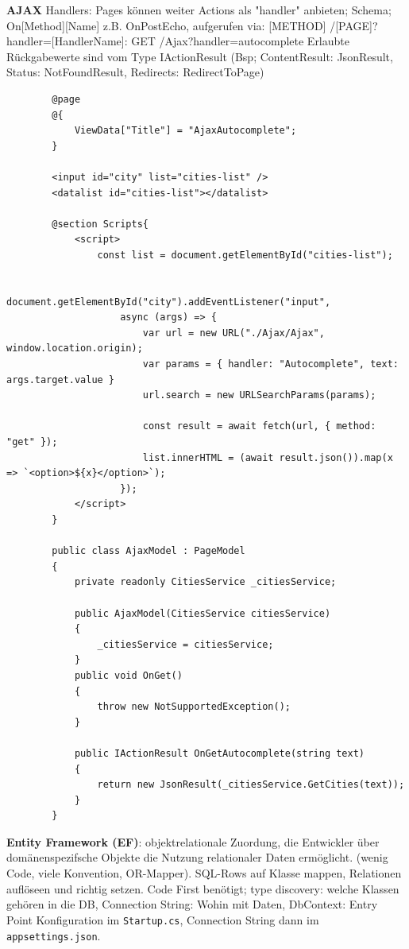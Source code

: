 \documentclass[10pt,landscape]{article}
\begin{document}
\begin{multicols}{2}
        \textbf{AJAX}
        Handlers: Pages können weiter Actions als "handler" anbieten; Schema; On[Method][Name] z.B. OnPostEcho, aufgerufen via: [METHOD] /[PAGE]?handler=[HandlerName]: GET /Ajax?handler=autocomplete
        Erlaubte Rückgabewerte sind vom Type IActionResult (Bsp; ContentResult: JsonResult, Status: NotFoundResult, Redirects: RedirectToPage)

        \begin{lstlisting}
        @page
        @{
            ViewData["Title"] = "AjaxAutocomplete";
        }

        <input id="city" list="cities-list" />
        <datalist id="cities-list"></datalist>

        @section Scripts{
            <script>
                const list = document.getElementById("cities-list");

                document.getElementById("city").addEventListener("input",
                    async (args) => {
                        var url = new URL("./Ajax/Ajax", window.location.origin);
                        var params = { handler: "Autocomplete", text: args.target.value }
                        url.search = new URLSearchParams(params);

                        const result = await fetch(url, { method: "get" });
                        list.innerHTML = (await result.json()).map(x => `<option>${x}</option>`);
                    });
            </script>
        }

        public class AjaxModel : PageModel
        {
            private readonly CitiesService _citiesService;

            public AjaxModel(CitiesService citiesService)
            {
                _citiesService = citiesService;
            }
            public void OnGet()
            {
                throw new NotSupportedException();
            }

            public IActionResult OnGetAutocomplete(string text)
            {
                return new JsonResult(_citiesService.GetCities(text));
            }
        }
        \end{lstlisting}

        \textbf{Entity Framework (EF)}: objektrelationale Zuordung, die Entwickler über domänenspezifsche Objekte die Nutzung relationaler Daten ermöglicht. (wenig Code, viele Konvention, OR-Mapper). SQL-Rows auf Klasse mappen, Relationen auflöseen und richtig setzen.
        Code First benötigt; type discovery: welche Klassen gehören in die DB, Connection String: Wohin mit Daten, DbContext: Entry Point
        Konfiguration im \lstinline{Startup.cs}, Connection String dann im \lstinline{appsettings.json}.


\end{multicols}
\end{document}
